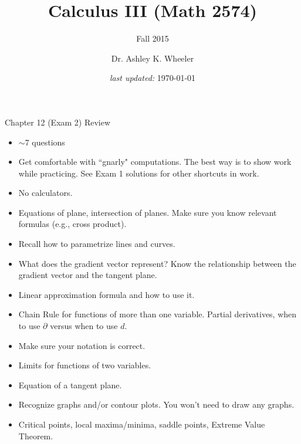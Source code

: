 \documentclass[12pt]{beamer}
\title[Cal III Fall 2015]{Calculus III (Math 2574)}
\subtitle{Fall 2015}
\author[Wheeler]{\footnotesize Dr. Ashley K. Wheeler}
\institute{University of Arkansas}
\date{\footnotesize{\it last updated:} \today}
\theoremstyle{plain}
\theoremstyle{definition}
\begin{document}


\begin{frame}[allowframebreaks]{Chapter 12 (Exam 2) Review}\footnotesize
\begin{itemize}
\item $\sim$7 questions
\item Get comfortable with ``gnarly" computations.  The best way is to show work while practicing.  See Exam 1 solutions for other shortcuts in work.
\item No calculators.  
\item Equations of plane, intersection of planes.  Make sure you know relevant formulas (e.g., cross product).
\item Recall how to parametrize lines and curves.
\item What does the gradient vector represent?  Know the relationship between the gradient vector and the tangent plane.  
\framebreak
\item Linear approximation formula and how to use it.
\item Chain Rule for functions of more than one variable.  Partial derivatives, when to use $\partial$ versus when to use $d$.  
\item Make sure your notation is correct.
\item Limits for functions of two variables.
\item Equation of a tangent plane.
\item Recognize graphs and/or contour plots.  You won't need to draw any graphs.
\item Critical points, local maxima/minima, saddle points, Extreme Value Theorem.
\end{itemize}
\end{frame}
\end{document}
